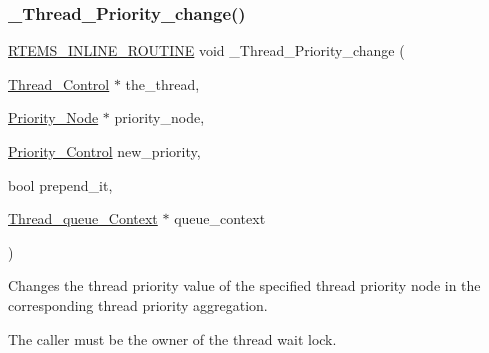\subsubsection{\texorpdfstring{\_Thread\_Priority\_change()}{\_Thread\_Priority\_change()}}
{\footnotesize\ttfamily \mbox{\hyperlink{group__RTEMSScoreBaseDefs_gac216239df231d5dbd15e3520b0b9313f}{R\+T\+E\+M\+S\+\_\+\+I\+N\+L\+I\+N\+E\+\_\+\+R\+O\+U\+T\+I\+NE}} void \+\_\+\+Thread\+\_\+\+Priority\+\_\+change (\begin{DoxyParamCaption}\item[{\mbox{\hyperlink{struct__Thread__Control}{Thread\+\_\+\+Control}} $\ast$}]{the\+\_\+thread,  }\item[{\mbox{\hyperlink{structPriority__Node}{Priority\+\_\+\+Node}} $\ast$}]{priority\+\_\+node,  }\item[{\mbox{\hyperlink{group__RTEMSScorePriority_ga59d02b58072d31a9a1cfe644557aefe2}{Priority\+\_\+\+Control}}}]{new\+\_\+priority,  }\item[{bool}]{prepend\+\_\+it,  }\item[{\mbox{\hyperlink{structThread__queue__Context}{Thread\+\_\+queue\+\_\+\+Context}} $\ast$}]{queue\+\_\+context }\end{DoxyParamCaption})}



Changes the thread priority value of the specified thread priority node in the corresponding thread priority aggregation. 

The caller must be the owner of the thread wait lock.


